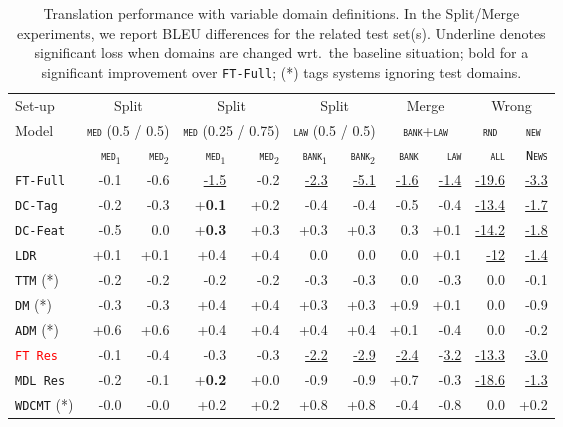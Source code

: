 \documentclass[11pt,a4paper]{article}
\newcommand{\fyDone}[1]{\done[FY]\Todo[FY:]{\textcolor{orange}{#1}}}
\newcommand{\revision}[1]{\textcolor{red}{#1}}
\newcommand{\domain}[1]{\texttt{\textsc{#1}}}
\newcommand{\system}[1]{\texttt{{#1}}}
\newcommand{\SB}[1]{\textbf{#1}}
\newcommand{\SW}[1]{\underline{#1}}
\begin{document}
\begin{table*}
  \centering%
  \begin{tabular}{|p{1.8cm}|*{10}{r|}} \hline
    \hfill Set-up & \multicolumn{2}{c|}{Split} &  \multicolumn{2}{c|}{Split} & \multicolumn{2}{c|}{Split} & \multicolumn{2}{c|}{Merge} & \multicolumn{2}{c|}{Wrong} \\ %
     Model \hfill & \multicolumn{2}{c|}{\domain{med} \footnotesize{(0.5 / 0.5)}} &  \multicolumn{2}{c|}{\domain{med} {\footnotesize (0.25 / 0.75)}} & \multicolumn{2}{c|}{\domain{law} {\footnotesize (0.5 / 0.5)}} & \multicolumn{2}{c|}{\domain{bank}+\domain{law}} &  \multicolumn{1}{c|}{\domain{rnd}} &  \multicolumn{1}{c|}{\domain{new}}\\ \hline
    & \domain{med}$_1$ & \domain{med}$_2$ & \domain{med}$_1$ & \domain{med}$_2$ &  \domain{bank}$_1$ & \domain{bank}$_2$ & \domain{bank} & \domain{law}   & \domain{all} & \domain{News} \\
    \system{FT-Full}      & -0.1 & -0.6 & \SW{-1.5} & -0.2& \SW{-2.3} & \SW{-5.1} &\SW{-1.6} & \SW{-1.4}& \SW{-19.6} & \SW{-3.3}\\%
    \system{DC-Tag}     & -0.2 & -0.3& +\SB{0.1}  & +0.2& -0.4 & -0.4 & -0.5 & -0.4 & \SW{-13.4} & \SW{-1.7}\\%
    \system{DC-Feat}    & -0.5 & 0.0 & +\SB{0.3}   & +0.3 & +0.3 & +0.3 & 0.3 & +0.1 & \SW{-14.2} &\SW{-1.8}\\ %
    \system{LDR}           & +0.1 & +0.1 & +0.4 & +0.4 & 0.0 &  0.0 &  0.0 & +0.1& \SW{-12} & \SW{-1.4}\\ %
    \system{TTM} (*)        & -0.2 &  -0.2 & -0.2 & -0.2 & -0.3 &-0.3 &  0.0 & -0.3 & 0.0 & -0.1\\
    \system{DM} (*)           & -0.3   & -0.3  & +0.4 & +0.4 & +0.3 & +0.3 & +0.9 & +0.1 & 0.0 &-0.9\\
    \system{ADM} (*)        & +0.6   & +0.6 & +0.4 & +0.4 & +0.4 & +0.4 &  +0.1 & -0.4 & 0.0&-0.2\\
    \revision{\system{FT Res}}   & -0.1   & -0.4 & -0.3 &-0.3 & \SW{-2.2} & \SW{-2.9} & \SW{-2.4} & -\SW{3.2} & \SW{-13.3} & \SW{-3.0}\\ %
    \system{MDL Res}   & -0.2   & -0.1 & +\SB{0.2} &+0.0 & -0.9 & -0.9 & +0.7 & -0.3 & \SW{-18.6} & \SW{-1.3}\\ %
    \system{WDCMT} (*)     & -0.0    & -0.0  & +0.2 & +0.2  & +0.8 & +0.8  & -0.4 & -0.8 & 0.0 & +0.2 \\
    \hline
  \end{tabular}
  \caption{Translation performance with variable domain definitions. In the Split/Merge experiments, we report BLEU differences for the related test set(s). Underline denotes significant loss when domains are changed wrt.\ the baseline situation; bold for a significant improvement over \system{FT-Full}; (*) tags systems ignoring test domains.
    \fyDone{Check wrong and significance of diff for ``old''}\fyDone{How about wrong ?}
  }
  \label{tab:redomains}
\end{table*}
\end{document}
